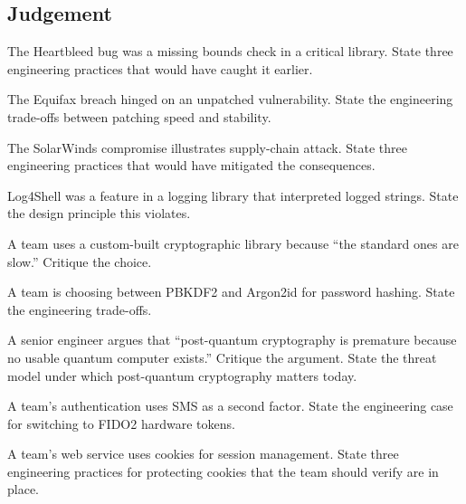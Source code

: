 \subsection*{Judgement}

\begin{exercise}
The Heartbleed bug was a missing bounds check in a critical library. State three engineering practices that would have caught it earlier.
\end{exercise}

\begin{exercise}
The Equifax breach hinged on an unpatched vulnerability. State the engineering trade-offs between patching speed and stability.
\end{exercise}

\begin{exercise}
The SolarWinds compromise illustrates supply-chain attack. State three engineering practices that would have mitigated the consequences.
\end{exercise}

\begin{exercise}
Log4Shell was a feature in a logging library that interpreted logged strings. State the design principle this violates.
\end{exercise}

\begin{exercise}
A team uses a custom-built cryptographic library because ``the standard ones are slow.'' Critique the choice.
\end{exercise}

\begin{exercise}
A team is choosing between PBKDF2 and Argon2id for password hashing. State the engineering trade-offs.
\end{exercise}

\begin{exercise}
A senior engineer argues that ``post-quantum cryptography is premature because no usable quantum computer exists.'' Critique the argument. State the threat model under which post-quantum cryptography matters today.
\end{exercise}

\begin{exercise}
A team's authentication uses SMS as a second factor. State the engineering case for switching to FIDO2 hardware tokens.
\end{exercise}

\begin{exercise}
A team's web service uses cookies for session management. State three engineering practices for protecting cookies that the team should verify are in place.
\end{exercise}

